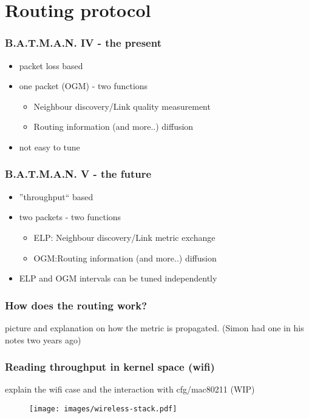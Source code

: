 \documentclass[slidestop]{beamer}
\begin{document}
\section{Routing protocol}
\begin{frame}[c]
	\frametitle{B.A.T.M.A.N. IV - the present}
	\begin{itemize}
		\item packet loss based
		\item one packet (OGM) - two functions
			\begin{itemize}
				\item Neighbour discovery/Link quality
					measurement
				\item Routing information (and more..) diffusion
			\end{itemize}
		\item not easy to tune
	\end{itemize}
\end{frame}

\begin{frame}[c]
	\frametitle{B.A.T.M.A.N. V - the future}
	\begin{itemize}
		\item ''throughput`` based
		\item two packets - two functions
			\begin{itemize}
				\item ELP: Neighbour discovery/Link metric
					exchange
				\item OGM:Routing information (and more..) diffusion
			\end{itemize}
		\item ELP and OGM intervals can be tuned independently
	\end{itemize}
	\begin{figure}
		\centering
	\end{figure}
\end{frame}

\begin{frame}[c]
	\frametitle{How does the routing work?}
	picture and explanation on how the metric is propagated. (Simon had one
	in his notes two years ago)
\end{frame}

\begin{frame}[c]
	\frametitle{Reading throughput in kernel space (wifi)}
	explain the wifi case and the interaction with cfg/mac80211 (WIP)
	\begin{figure}
		\centering
		\texttt{[image: images/wireless-stack.pdf]}
	\end{figure}
\end{frame}
\end{document}
